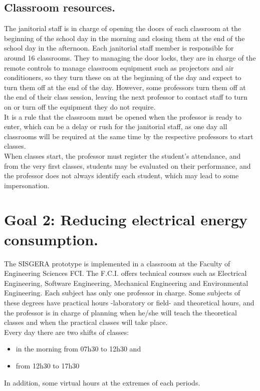 \documentclass[]{scrartcl}
\begin{document}
	\subsection*{Classroom resources.}
	The janitorial staff is in charge of opening the doors of each classroom at the beginning of the school day in the morning and closing them at the end of the school day in the afternoon. Each janitorial staff member is responsible for around 16 classrooms. They to managing the door locks, they are in charge of the remote controls to manage classroom equipment such as projectors and air conditioners, so they turn these on at the beginning of the day and expect to turn them off at the end of the day. However, some professors turn them off at the end of their class session, leaving the next professor to contact staff to turn on or turn off the equipment they do not require.\\
	It is a rule that the classroom must be opened when the professor is ready to enter, which can be a delay or rush for the janitorial staff, as one day all classrooms will be required at the same time by the respective professors to start classes.\\
	When classes start, the professor must register the student's attendance, and from the very first classes, students may be evaluated on their performance, and the professor does not always identify each student, which may lead to some impersonation.
\section*{Goal 2: Reducing electrical energy consumption.}
	The SISGERA prototype is implemented in a classroom at the Faculty of Engineering Sciences FCI. The F.C.I. offers technical courses such as Electrical Engineering, Software Engineering, Mechanical Engineering and Environmental Engineering. Each subject has only one professor in charge. Some subjects of these degrees have practical hours -laboratory or field- and theoretical hours, and the professor is in charge of planning when he/she will teach the theoretical classes and when the practical classes will take place.\\
	Every day there are two shifts of classes:
	\begin{itemize}
		\item in the morning from 07h30 to 12h30 and 
		\item from 12h30 to 17h30
	\end{itemize}
	In addition, some virtual hours at the extremes of each periods.
\end{document}
